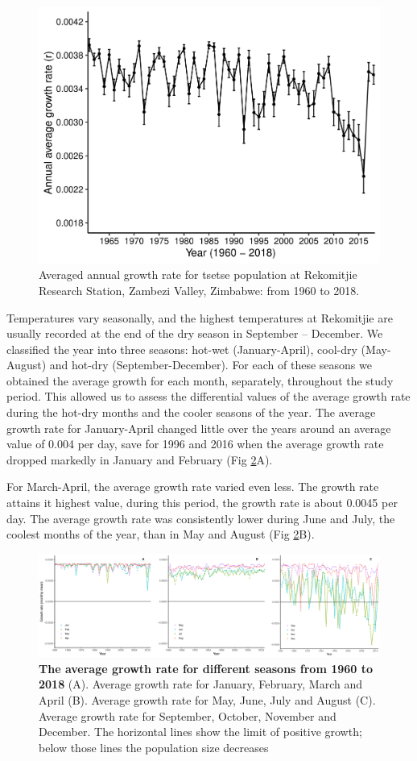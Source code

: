 \documentclass[12pt,a4paper]{article}
\begin{document}
\begin{figure}[hbt!]
	\centering
	\includegraphics[width=0.8\linewidth]{GratewithErrBars}
	\caption{Averaged annual growth rate for tsetse population at Rekomitjie Research Station, Zambezi Valley, Zimbabwe: from 1960 to 2018.}
	\label{fig:tsetseflowchat0}
\end{figure} 
Temperatures vary seasonally, and the highest temperatures at Rekomitjie are usually recorded at the end of the dry season in September – December. We classified the year into three seasons: hot-wet (January-April), cool-dry (May-August) and hot-dry (September-December). For each of these seasons we obtained the average growth for each month, separately, throughout the study period. This allowed us to assess the differential values of the average growth rate during the hot-dry months and the cooler seasons of the year. The average growth rate for January-April changed little over the years around an average value of 0.004 per day, save for 1996 and 2016 when the average growth rate dropped markedly in January and February (Fig \ref{fig:tsetseflowchat2}A).  

For March-April, the average growth rate varied even less. The growth rate attains it highest value, during this period, the growth rate is about 0.0045 per day. The average growth rate was consistently lower during June and July, the coolest months of the year, than in May and August (Fig \ref{fig:tsetseflowchat2}B).  

\begin{figure}[h]
	\centering
	\includegraphics[width=1.1\linewidth]{MonthlyGrowthRateDec12}
	\caption{ {\bf The average growth rate for different seasons from 1960 to 2018} (A). Average growth rate for January, February, March and April (B). Average growth rate for May, June, July and August (C). Average growth rate for September, October, November and December. The horizontal lines show the limit of positive growth; below those lines the population size decreases}
	\label{fig:tsetseflowchat2}
\end{figure}
\end{document}
